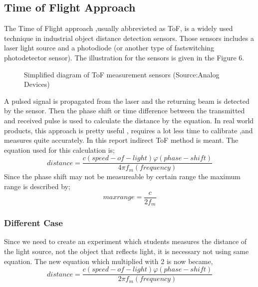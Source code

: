 \documentclass[letterpaper,12pt]{article}
\begin{document}
\subsection{Time of Flight Approach}
The Time of Flight approach ,usually abbrevieted as ToF, is a widely used technique in industrial object distance detection sensors. Those sensors includes a laser light source and a photodiode (or another type of fastswitching photodetector sensor). The illustration for the sensors is given in the Figure 6.
\begin{figure}[H] 
	\caption{Simplified diagram of ToF measurement sensors (Source:Analog Devices)}
\end{figure}
A pulsed signal is propagated from the laser and the returning beam is detected by the sensor. Then the phase shift or time difference  between the transmitted and received pulse is used to calculate the distance by the equation.
In real world products, this approach is pretty useful , requires a lot less time to calibrate ,and measures quite accurately. In this report indirect ToF method is meant. The equation used for this calculation is; 
\[distance = \frac{  c(speed-of-light)  \varphi (phase-shift)  }{4 \pi f_m (frequency)}\]
Since the phase shift may not be measureable by certain range the maximum range is described by;
\[maxrange = \frac{c}{2 f_m}\]
\subsubsection{Different Case}
Since we need to create an experiment which students measures the distance of the light source, not the object that reflects light, it is necessary not using same equation. The new equation which multiplied with 2 is now became,
\[distance = \frac{  c(speed-of-light)  \varphi (phase-shift)  }{2 \pi f_m (frequency)}\]
\end{document}
